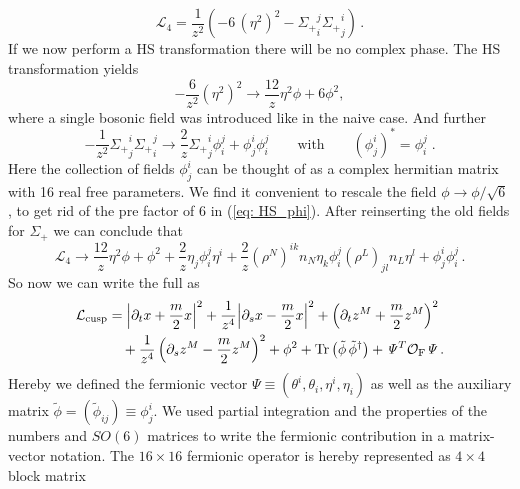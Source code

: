 %
%
\begin{equation}
\mathcal{L}_4= \frac{1}{z^2}\left(- 6\, (\eta^2)^2 - {\Sigma_{+}}_i^j{\Sigma_{+}}_j^i \right)\,.
\end{equation}
%
%
If we now perform a HS transformation there will be no complex phase. The HS transformation yields
%
%
\begin{equation}
 -\frac{6}{z^2}(\eta^2)^2\to \frac{12}{z} \eta^2 \phi +6\phi^2,
 \label{eq: HS_phi}
\end{equation}
%
%
where a single bosonic field was introduced like in the naive case. And further
%
%
\begin{equation}
-\frac{1}{z^{2}}{\Sigma_{+}}^{i}_{j}{\Sigma_{+}}^{j}_{i} \rightarrow \frac{2}{z}{\Sigma_{+}}^{i}_{j}\phi^{j}_{i} + \phi^{i}_{j}\phi^{j}_{i}
\qquad \text{with} \qquad \left(\phi^{i}_{j}\right)^{\ast} = \phi^{j}_{i}\;.
\end{equation}
%
%
Here the collection of fields $\phi^{i}_{j}$ can be thought of as a complex hermitian matrix with 16 real free parameters. We find it convenient to rescale the field $\phi \to \phi / \sqrt{6}$, to get rid of the pre factor of 6 in (\ref{eq: HS_phi}). After reinserting the old fields for $\Sigma_{+}$ we can conclude that
%
%
\begin{equation}
 \mathcal{L}_4\to \frac{12}{z} \eta^2 \phi +\phi^2+\frac{2}{z}\eta_j \phi^j_i \eta^i +\frac{2}{z} (\rho^N)^{ik}n_N \eta_k\phi^j_i  (\rho^L)_{jl}n_L  \eta^l+\phi^i_j \phi^j_i\,. 
\end{equation}
%
%
So now we can write the full  as 
%
%
\begin{align}
\mathcal{L}_{\rm cusp} &=  {\left\vert \partial_t {x} + {\frac{m}{2}}{x} \right\vert}^2 + \frac{1}{{ z}^4}{\left\vert \partial_s {x} -\frac{m}{2}{x} \right\vert}^2 + \left(\partial_t {z}^M + \frac{m}{2}{z}^M \right)^2 \\ &\quad+ \frac{1}{{ z}^4} \left(\partial_s {z}^M -\frac{m}{2}{z}^M\right)^2 
+ \phi^2 + {\rm Tr} \left( \tilde{\phi}\, \tilde{\phi}^{\dagger} \right) + \mathit{\Psi}^T \mathcal{O}_{\rm F} \mathit{\Psi} \,. \notag
\end{align}
%
%
Hereby we defined the fermionic vector $\mathit{\Psi}\equiv (\theta^{i},\theta_{i},\eta^{i},\eta_{i})$ as well as the auxiliary matrix ${\tilde{\phi}= (\tilde{\phi}_{ij}) \equiv \phi^{i}_{j}}$. We used partial integration and the properties of the  numbers and $SO(6)$ matrices to write the fermionic contribution in a matrix-vector notation. The $16\times 16$ fermionic operator is hereby represented as $4\times 4$ block matrix
